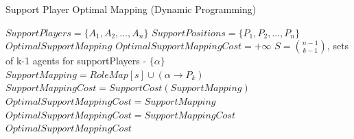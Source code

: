 \begin{algorithm}[t!]
\caption{Support Player Optimal Mapping (Dynamic Programming)}
\label{alg3}
\begin{algorithmic}[1]
$SupportPlayers = \lbrace A_{1},A_{2},...,A_{n} \rbrace $
$SupportPositions = \lbrace P_{1},P_{2},...,P_{n} \rbrace $
$Optimal Support Mapping$
\STATE
\STATE $OptimalSupportMappingCost = +\infty$
\STATE $ S = {{n-1}\choose{k-1}} $, sets of k-1 agents for supportPlayers - $\lbrace \alpha \rbrace$
\STATE $SupportMapping = RoleMap[s] \cup (\alpha \rightarrow P_{k})$
\STATE $SupportMappingCost = SupportCost(SupportMapping)$
\STATE $OptimalSupportMappingCost = SupportMapping$
\STATE $OptimalSupportMappingCost = SupportMappingCost$
\ENDIF
\ENDFOR
\ENDFOR
\ENDFOR
\RETURN $OptimalSupportMappingCost$
\end{algorithmic}
\end{algorithm}

